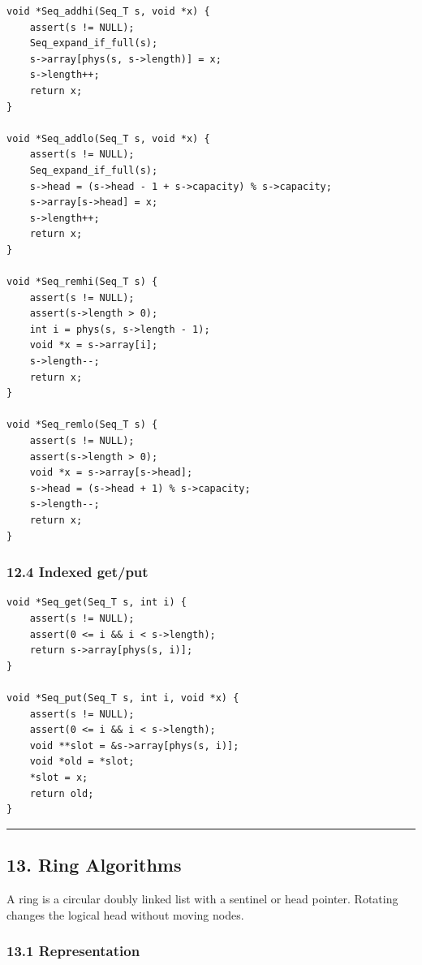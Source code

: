 \documentclass[11pt]{article}
\begin{document}
\begin{verbatim}
void *Seq_addhi(Seq_T s, void *x) {
    assert(s != NULL);
    Seq_expand_if_full(s);
    s->array[phys(s, s->length)] = x;
    s->length++;
    return x;
}

void *Seq_addlo(Seq_T s, void *x) {
    assert(s != NULL);
    Seq_expand_if_full(s);
    s->head = (s->head - 1 + s->capacity) % s->capacity;
    s->array[s->head] = x;
    s->length++;
    return x;
}

void *Seq_remhi(Seq_T s) {
    assert(s != NULL);
    assert(s->length > 0);
    int i = phys(s, s->length - 1);
    void *x = s->array[i];
    s->length--;
    return x;
}

void *Seq_remlo(Seq_T s) {
    assert(s != NULL);
    assert(s->length > 0);
    void *x = s->array[s->head];
    s->head = (s->head + 1) % s->capacity;
    s->length--;
    return x;
}
\end{verbatim}

\subsubsection{12.4 Indexed get/put}\label{indexed-getput}

\begin{verbatim}
void *Seq_get(Seq_T s, int i) {
    assert(s != NULL);
    assert(0 <= i && i < s->length);
    return s->array[phys(s, i)];
}

void *Seq_put(Seq_T s, int i, void *x) {
    assert(s != NULL);
    assert(0 <= i && i < s->length);
    void **slot = &s->array[phys(s, i)];
    void *old = *slot;
    *slot = x;
    return old;
}
\end{verbatim}

\begin{center}\rule{0.5\linewidth}{0.5pt}\end{center}

\subsection{13. Ring Algorithms}\label{ring-algorithms}

A ring is a circular doubly linked list with a sentinel or head pointer. Rotating changes the logical head without moving nodes.

\subsubsection{13.1 Representation}\label{representation-5}
\end{document}
